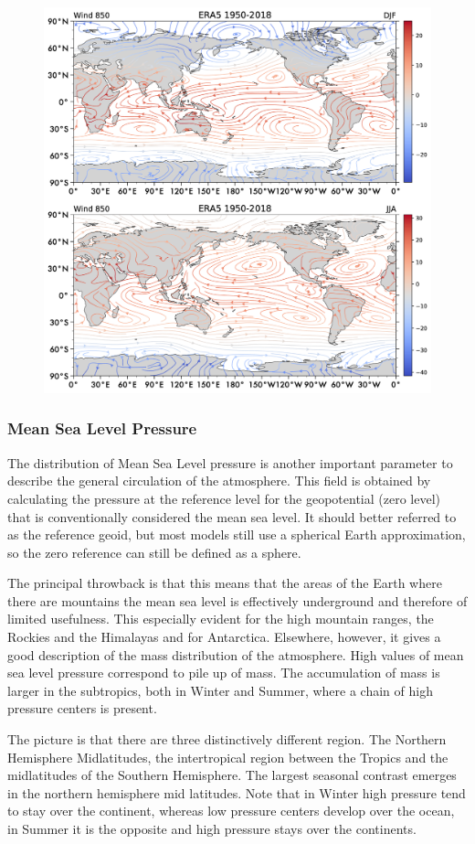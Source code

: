 \begin{figure}
\centering
\includegraphics[width = .7 \textwidth]{figs/GD/Wind850.png}
\caption{}\label{}
\end{figure}

\subsubsection{Mean Sea Level Pressure}\label{mean-sea-level-pressure}

The distribution of Mean Sea Level pressure is another important
parameter to describe the general circulation of the atmosphere. This
field is obtained by calculating the pressure at the reference level for
the geopotential (zero level) that is conventionally considered the mean
sea level. It should better referred to as the reference geoid, but most
models still use a spherical Earth approximation, so the zero reference
can still be defined as a sphere.

The principal throwback is that this means that the areas of the Earth
where there are mountains the mean sea level is effectively underground
and therefore of limited usefulness. This especially evident for the
high mountain ranges, the Rockies and the Himalayas and for Antarctica.
Elsewhere, however, it gives a good description of the mass distribution
of the atmosphere. High values of mean sea level pressure correspond to
pile up of mass. The accumulation of mass is larger in the subtropics,
both in Winter and Summer, where a chain of high pressure centers is
present.

The picture is that there are three distinctively different region. The
Northern Hemisphere Midlatitudes, the intertropical region between the
Tropics and the midlatitudes of the Southern Hemisphere. The largest
seasonal contrast emerges in the northern hemisphere mid latitudes. Note
that in Winter high pressure tend to stay over the continent, whereas
low pressure centers develop over the ocean, in Summer it is the
opposite and high pressure stays over the continents.


